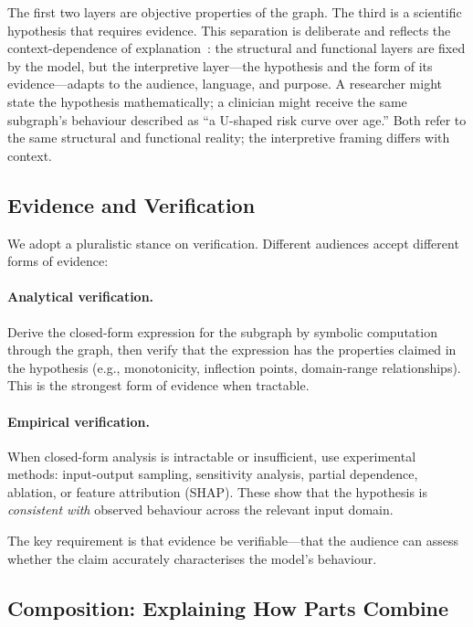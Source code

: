 \documentclass[11pt]{article}
\begin{document}
The first two layers are objective properties of the graph. The third is a scientific hypothesis that requires evidence. This separation is deliberate and reflects the context-dependence of explanation~\cite{merry2021mental}: the structural and functional layers are fixed by the model, but the interpretive layer---the hypothesis and the form of its evidence---adapts to the audience, language, and purpose. A researcher might state the hypothesis mathematically; a clinician might receive the same subgraph's behaviour described as ``a U-shaped risk curve over age.'' Both refer to the same structural and functional reality; the interpretive framing differs with context.

\subsection{Evidence and Verification}

We adopt a pluralistic stance on verification. Different audiences accept different forms of evidence:

\paragraph{Analytical verification.} Derive the closed-form expression for the subgraph by symbolic computation through the graph, then verify that the expression has the properties claimed in the hypothesis (e.g., monotonicity, inflection points, domain-range relationships). This is the strongest form of evidence when tractable.

\paragraph{Empirical verification.} When closed-form analysis is intractable or insufficient, use experimental methods: input-output sampling, sensitivity analysis, partial dependence, ablation, or feature attribution (SHAP). These show that the hypothesis is \emph{consistent with} observed behaviour across the relevant input domain.

The key requirement is that evidence be verifiable---that the audience can assess whether the claim accurately characterises the model's behaviour.

\subsection{Composition: Explaining How Parts Combine}
\end{document}

